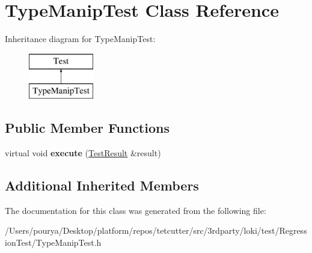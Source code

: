 \hypertarget{classTypeManipTest}{}\section{Type\+Manip\+Test Class Reference}
\label{classTypeManipTest}
Inheritance diagram for Type\+Manip\+Test\+:\begin{figure}[H]
\begin{center}
\leavevmode
\includegraphics[height=2.000000cm]{classTypeManipTest}
\end{center}
\end{figure}
\subsection*{Public Member Functions}
\begin{DoxyCompactItemize}
\item 
\hypertarget{classTypeManipTest_a1a37530680423e7bd0cbd7fd1c91bf0e}{}virtual void {\bfseries execute} (\hyperlink{classTestResult}{Test\+Result} \&result)\label{classTypeManipTest_a1a37530680423e7bd0cbd7fd1c91bf0e}

\end{DoxyCompactItemize}
\subsection*{Additional Inherited Members}


The documentation for this class was generated from the following file\+:\begin{DoxyCompactItemize}
\item 
/\+Users/pourya/\+Desktop/platform/repos/tetcutter/src/3rdparty/loki/test/\+Regression\+Test/Type\+Manip\+Test.\+h\end{DoxyCompactItemize}
